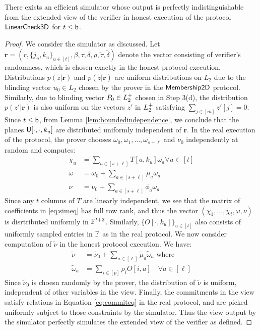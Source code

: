 \begin{lemma}\label{lem:simlincheck}
There exists an efficient simulator whose output is perfectly indistinguishable
from the extended view of the verifier in honest execution of the protocol
$\mathsf{LinearCheck3D}$ for $t\leq \mathsf{b}$.
\end{lemma}
\begin{proof}
We consider the simulator as discussed. Let $\bm{r}=(r,\{j_u,k_u\}_{u\in
[t]},\beta,\tau,\delta,\rho,\tilde{\tau},\tilde{\delta})$ denote the vector
consisting of verifier's randomness, which is chosen exactly in the honest
protocol execution. Distributions $p(z|\bm{r})$ and $p(\tilde{z}|\bm{r})$ are
uniform distributions on $L_2$ due to the blinding vector $u_0\in L_2$ chosen by
the prover in the $\mathsf{Membership2D}$ protocol. Similarly, due to blinding vector
$P_0\in L^{+}_2$ chosen in Step 3(d), the distribution
$p(z'|\bm{r})$ is also uniform on the vectors $z'$ in $L^{+}_2$ satisfying
$\sum_{j\in [m]}z'[j]=0$. Since $t\leq \mathsf{b}$, from Lemma
\ref{lem:boundedindependence}, we conclude that the planes
$\mathsf{U}[\cdot,\cdot,k_u]$ are distributed uniformly independent of $\bm{r}$. In
the real execution of the protocol, the prover chooses
$\omega_0,\omega_1,\ldots,\omega_{s+\ell}$ and $\nu_0$ independently at random
and computes:
\begin{align}\label{eq:simeq}
\chi_u &= \sum_{a\in [s+\ell]}T[a,k_u]\omega_a \forall u\in [t] \nonumber \\
\omega &= \omega_0 + \sum_{a\in [s+\ell]}\mu_a\omega_a \nonumber \\
\nu &= \nu_0 + \sum_{a\in [s+\ell]}\phi_a\omega_a
\end{align}    
Since any $t$ columns of $T$ are linearly independent, we see that the matrix of
coefficients in \eqref{eq:simeq} has full row rank, and thus the vector
$(\chi_1,\ldots,\chi_t,\omega,\nu)$ is disrtributed uniformly in $\mathbb{F}^{t+2}$.
Similarly, $\{O[\cdot,k_u]\}_{u\in [t]}$ also consists of uniformly sampled
entries in $\mathbb{F}$ as in the real protocol. We now consider computation of
$\tilde{\nu}$ in the honest protocol execution. We have:
\begin{align}\label{eq:simeq2}
\tilde{\nu} &= \tilde{\nu}_0 + \sum_{a\in [\ell]}\tilde{\mu}_a\tilde{\omega}_a
 \text{ where } \nonumber \\
\tilde{\omega}_a &= \sum_{i\in [p]}\rho_iO[i,a] \quad \forall a\in [\ell]
\end{align} 
Since $\tilde{\nu}_0$ is choesn randomly by the prover, the distribution of
$\tilde{\nu}$ is uniform, independent of other variables in the view. Finally,
the commitments in the view satisfy relations in Equation \ref{eq:commiteq} in
the real protocol, and are picked uniformly subject to those constraints by the
simulator. Thus the view output by the simulator perfectly simulates the
extended view of the verifier as defined. 
\end{proof}

